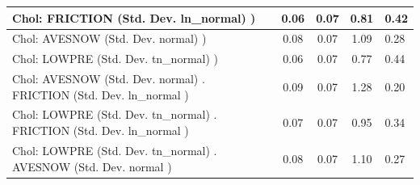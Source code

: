 \begin{table}
\begin{center}
\begin{tabular}{|l|l|c|c|c|l|}
			\hline
			 Chol: FRICTION (Std. Dev. ln_normal) ) &  & 0.06 & 0.07 & 0.81 & 0.42 \\
			\hline
			 Chol: AVESNOW (Std. Dev. normal) ) &  & 0.08 & 0.07 & 1.09 & 0.28 \\
			\hline
			 Chol: LOWPRE (Std. Dev. tn_normal) ) &  & 0.06 & 0.07 & 0.77 & 0.44 \\
			\hline
			 Chol: AVESNOW (Std. Dev. normal) . FRICTION (Std. Dev.   ln_normal ) &  & 0.09 & 0.07 & 1.28 & 0.20 \\
			\hline
			 Chol: LOWPRE (Std. Dev. tn_normal) . FRICTION (Std. Dev.   ln_normal ) &  & 0.07 & 0.07 & 0.95 & 0.34 \\
			\hline
			 Chol: LOWPRE (Std. Dev. tn_normal) . AVESNOW (Std. Dev.   normal ) &  & 0.08 & 0.07 & 1.10 & 0.27 \\
			\hline
		\end{tabular}
	\end{center}
\end{table}